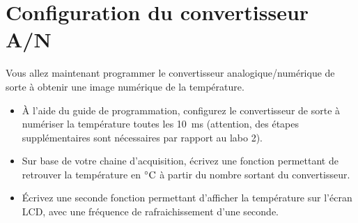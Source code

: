 \documentclass[11pt,a4paper]{article}
\theoremstyle{definition}%
\begin{document}



\section{Configuration du convertisseur A/N}
Vous allez maintenant programmer le convertisseur analogique/numérique de sorte à obtenir une image numérique de la température.
\begin{itemize}
	\item À l’aide du guide de programmation, configurez le convertisseur de sorte à numériser la température toutes les 10~ms (attention, des étapes supplémentaires sont nécessaires par rapport au labo 2).
	\item Sur base de votre chaine d’acquisition, écrivez une fonction permettant de retrouver la température en $\celsius$ à partir du nombre sortant du convertisseur.
	\item Écrivez une seconde fonction permettant d’afficher la température sur l’écran LCD, avec une fréquence de rafraichissement d’une seconde.
\end{itemize}






\end{document}
